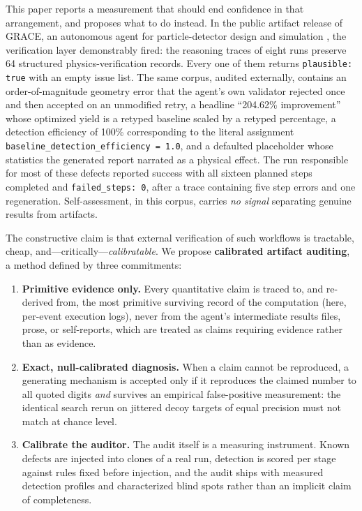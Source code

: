 \documentclass{article}
\begin{document}
This paper reports a measurement that should end confidence in that arrangement, and proposes what to do instead. In the public artifact release of GRACE, an autonomous agent for particle-detector design and simulation \citep{grace, gracedata}, the verification layer demonstrably fired: the reasoning traces of eight runs preserve 64 structured physics-verification records. Every one of them returns \texttt{plausible: true} with an empty issue list. The same corpus, audited externally, contains an order-of-magnitude geometry error that the agent's own validator rejected once and then accepted on an unmodified retry, a headline ``204.62\% improvement'' whose optimized yield is a retyped baseline scaled by a retyped percentage, a detection efficiency of 100\% corresponding to the literal assignment \texttt{baseline\_detection\_efficiency = 1.0}, and a defaulted placeholder whose statistics the generated report narrated as a physical effect. The run responsible for most of these defects reported success with all sixteen planned steps completed and \texttt{failed\_steps: 0}, after a trace containing five step errors and one regeneration. Self-assessment, in this corpus, carries \emph{no signal} separating genuine results from artifacts.

The constructive claim is that external verification of such workflows is tractable, cheap, and---critically---\emph{calibratable}. We propose \textbf{calibrated artifact auditing}, a method defined by three commitments:

\begin{enumerate}
  \item \textbf{Primitive evidence only.} Every quantitative claim is traced to, and re-derived from, the most primitive surviving record of the computation (here, per-event execution logs), never from the agent's intermediate results files, prose, or self-reports, which are treated as claims requiring evidence rather than as evidence.
  \item \textbf{Exact, null-calibrated diagnosis.} When a claim cannot be reproduced, a generating mechanism is accepted only if it reproduces the claimed number to all quoted digits \emph{and} survives an empirical false-positive measurement: the identical search rerun on jittered decoy targets of equal precision must not match at chance level.
  \item \textbf{Calibrate the auditor.} The audit itself is a measuring instrument. Known defects are injected into clones of a real run, detection is scored per stage against rules fixed before injection, and the audit ships with measured detection profiles and characterized blind spots rather than an implicit claim of completeness.
\end{enumerate}
\end{document}
